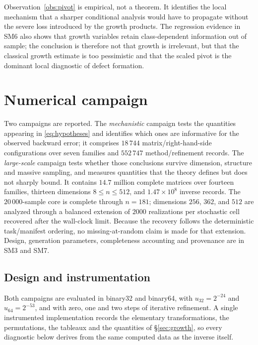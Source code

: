 \documentclass[review,onefignum,onetabnum]{siamart251216}
\begin{document}
Observation~\ref{obs:pivot} is empirical, not a theorem. It identifies the local mechanism that a
sharper conditional analysis would have to propagate without the severe loss introduced by the
growth products. The regression evidence in SM6 also shows that growth variables retain
class-dependent information out of sample; the conclusion is therefore not that growth is
irrelevant, but that the classical growth estimate is too pessimistic and that the scaled pivot is
the dominant local diagnostic of defect formation.

\section{Numerical campaign}
\label{sec:experiments}

Two campaigns are reported. The \emph{mechanistic} campaign tests the quantities appearing in
\eqref{eq:hypotheses} and identifies which ones are informative for the observed backward error; it
comprises $18\,744$ matrix/right-hand-side configurations over seven families and $552\,747$
method/refinement records. The \emph{large-scale} campaign tests whether those conclusions survive
dimension, structure and massive sampling, and measures quantities that the theory defines but
does not sharply bound. It contains $14.7$ million complete matrices over fourteen families,
thirteen dimensions $8\le n\le512$, and $1.47\times10^8$ inverse records. The $20\,000$-sample
core is complete through $n=181$; dimensions $256$, $362$, and $512$ are analyzed through a
balanced extension of $2000$ realizations per stochastic cell recovered after the wall-clock limit.
Because the recovery follows the deterministic task/manifest ordering, no missing-at-random claim
is made for that extension. Design, generation parameters, completeness accounting and provenance
are in SM3 and SM7.

\subsection{Design and instrumentation}
\label{sec:design}

Both campaigns are evaluated in binary32 and binary64, with $u_{32}=2^{-24}$ and
$u_{64}=2^{-53}$, and with zero, one and two steps of iterative refinement. A single instrumented
implementation records the elementary transformations, the permutations, the tableaux and the
quantities of \S\ref{sec:growth}, so every diagnostic below derives from the same computed data
as the inverse itself.
\end{document}
